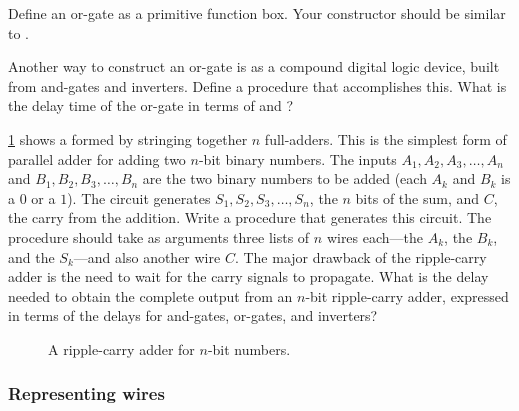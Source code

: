 \begin{exercise}
	\label{Exercise 3.28}
	Define an or-gate as a primitive function box.
	Your  constructor should be similar to .
\end{exercise}



\begin{exercise}
	\label{Exercise 3.29}
	Another way to construct an or-gate is as a compound digital logic device, built from and-gates and inverters.
	Define a procedure  that accomplishes this.
	What is the delay time of the or-gate in terms of  and ?
\end{exercise}



\begin{exercise}
	\label{Exercise 3.30}
	\cref{Figure 3.27} shows a  formed by stringing together \( n \) full-adders.
	This is the simplest form of parallel adder for adding two \( n \)-bit binary numbers.
	The inputs \( A_1, A_2, A_3, \dotsc, A_n \) and \( B_1, B_2, B_3, \dotsc, B_n \) are the two binary numbers to be added (each \( A_k \) and \( B_k \) is a \( 0 \) or a \( 1 \)).
	The circuit generates \( S_1, S_2, S_3, \dotsc, S_n \), the \( n \) bits of the sum, and \( C \), the carry from the addition.
	Write a procedure  that generates this circuit.
	The procedure should take as arguments three lists of \( n \) wires each---the \( A_k \), the \( B_k \), and the \( S_k \)---and also another wire \( C \).
	The major drawback of the ripple-carry adder is the need to wait for the carry signals to propagate.
	What is the delay needed to obtain the complete output from an \( n \)-bit ripple-carry adder, expressed in terms of the delays for and-gates, or-gates, and inverters?
\end{exercise}



\begin{figure}[tb]
	\centering
	
	\caption{
		A ripple-carry adder for \( n \)-bit numbers.
	}
	\label{Figure 3.27}
\end{figure}



\subsubsection*{Representing wires}

